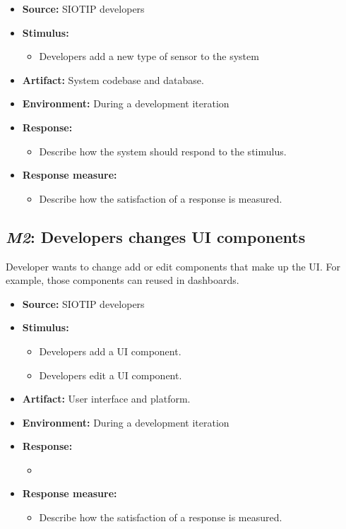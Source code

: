 \documentclass[english]{sareport}
\begin{document}
\begin{itemize}
    \item \textbf{Source:} SIOTIP developers
    \item \textbf{Stimulus:}
        \begin{itemize}
            \item Developers add a new type of sensor to the system
        \end{itemize}

    \item \textbf{Artifact:} System codebase and database.
    \item \textbf{Environment:} During a development iteration
    \item \textbf{Response:}
        \begin{itemize}
            \item Describe how the system should respond to the stimulus.
        \end{itemize}

    \item \textbf{Response measure:}
        \begin{itemize}
            \item Describe how the satisfaction of a response is measured.
        \end{itemize}
\end{itemize}

\subsection{\emph{M2}: Developers changes UI components}
Developer wants to change add or edit components that make up the UI.
For example, those components can reused in dashboards.

\begin{itemize}
    \item \textbf{Source:} SIOTIP developers
    \item \textbf{Stimulus:}
        \begin{itemize}
            \item Developers add a UI component.
            \item Developers edit a UI component.
        \end{itemize}

    \item \textbf{Artifact:} User interface and platform.
    \item \textbf{Environment:} During a development iteration
    \item \textbf{Response:}
        \begin{itemize}
            \item
        \end{itemize}

    \item \textbf{Response measure:}
        \begin{itemize}
            \item Describe how the satisfaction of a response is measured.
        \end{itemize}
\end{itemize}
\end{document}
